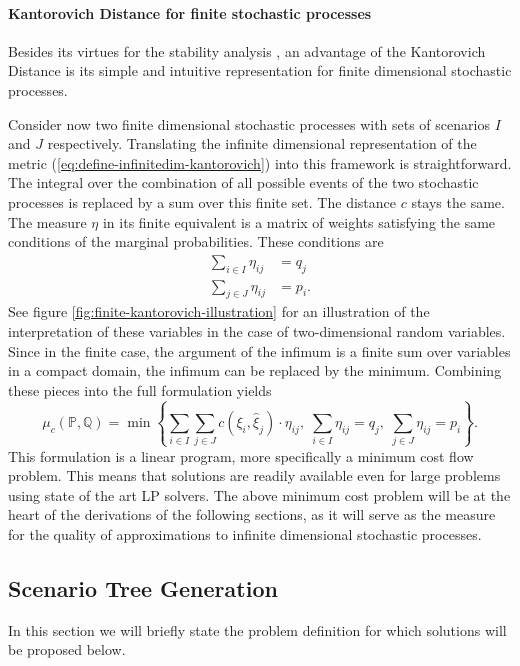 \paragraph{Kantorovich Distance for finite stochastic processes}
Besides its virtues for the stability analysis \cite{Dupacova2003}, an advantage of the Kantorovich Distance is its simple and intuitive representation for finite dimensional stochastic processes.

Consider now two finite dimensional stochastic processes with sets of scenarios $I$ and $J$ respectively.
Translating the infinite dimensional representation of the metric (\ref{eq:define-infinitedim-kantorovich}) into this framework is straightforward.
The integral over the combination of all possible events of the two stochastic processes is replaced by a sum over this finite set.
The distance $c$ stays the same.
The measure $\eta$ in its finite equivalent is a matrix of weights satisfying the same conditions of the marginal probabilities.
These conditions are
\begin{align}
  \label{eq:finitedim-marginals-eta}
  \sum_{i\in I} \eta_{ij} &= q_j\\
  \sum_{j\in J} \eta_{ij} &= p_i.
\end{align}
See figure \ref{fig:finite-kantorovich-illustration} for an illustration of the interpretation of these variables in the case of two-dimensional random variables.
Since in the finite case, the argument of the infimum is a finite sum over variables in a compact domain, the infimum can be replaced by the minimum. Combining these pieces into the full formulation yields
\begin{equation}
  \label{eq:define-finitedim-Kantorovich}
  \mu_c(\mathbb{P}, \mathbb{Q}) = \min\left\{\sum_{i\in I}\sum_{j\in J}c(\xi_i,\hat{\xi}_j)\cdot \eta_{ij},\; \sum_{i\in I}\eta_{ij}=q_j,\;\sum_{j\in J}\eta_{ij}=p_i\right\}.
\end{equation}
This formulation is a linear program, more specifically a minimum cost flow problem. This means that solutions are readily available even for large problems using state of the art LP solvers. The above minimum cost problem will be at the heart of the derivations of the following sections, as it will serve as the measure for the quality of approximations to infinite dimensional stochastic processes.
\subsection{Scenario Tree Generation}
In this section we will briefly state the problem definition for which solutions will be proposed below.

